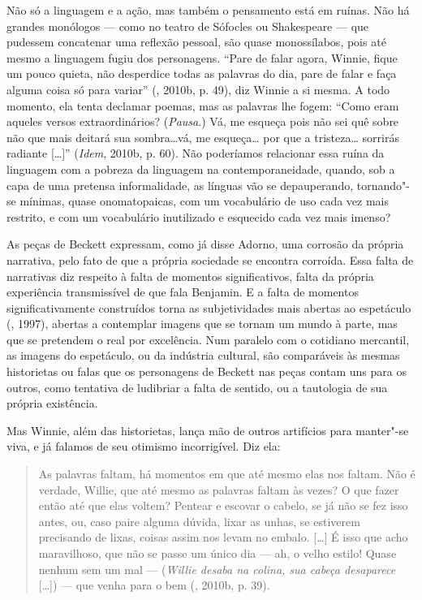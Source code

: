 Não só a linguagem e a ação, mas também o pensamento está em ruínas. Não
há grandes monólogos --- como no teatro de Sófocles ou Shakespeare --- que
pudessem concatenar uma reflexão pessoal, são quase monossílabos, pois
até mesmo a linguagem fugiu dos personagens. ``Pare de falar agora,
Winnie, fique um pouco quieta, não desperdice todas as palavras do dia,
pare de falar e faça alguma coisa só para variar'' (, 2010b, p.
49), diz Winnie a si mesma. A todo momento, ela tenta declamar poemas,
mas as palavras lhe fogem: ``Como eram aqueles versos extraordinários?
(\emph{Pausa}.) Vá, me esqueça pois não sei quê sobre não que mais
deitará sua sombra\ldots{}vá, me esqueça\ldots{} por que a tristeza\ldots{} sorrirás
radiante [\ldots{}]'' (\emph{Idem}, 2010b, p. 60). Não poderíamos
relacionar essa ruína da linguagem com a pobreza da linguagem na
contemporaneidade, quando, sob a capa de uma pretensa informalidade, as
línguas vão se depauperando, tornando"-se mínimas, quase onomatopaicas,
com um vocabulário de uso cada vez mais restrito, e com um vocabulário
inutilizado e esquecido cada vez mais imenso?

As peças de Beckett expressam, como já disse Adorno, uma corrosão da
própria narrativa, pelo fato de que a própria sociedade se encontra
corroída. Essa falta de narrativas diz respeito à falta de momentos
significativos, falta da própria experiência transmissível de que fala
Benjamin. E a falta de momentos significativamente construídos torna as
subjetividades mais abertas ao espetáculo (, 1997), abertas a
contemplar imagens que se tornam um mundo à parte, mas que se pretendem o
real por excelência. Num paralelo com o cotidiano mercantil, as imagens
do espetáculo, ou da indústria cultural, são comparáveis às mesmas
historietas ou falas que os personagens de Beckett nas peças contam uns
para os outros, como tentativa de ludibriar a falta de sentido, ou a
tautologia de sua própria existência.

Mas Winnie, além das historietas, lança mão de outros artifícios para
manter"-se viva, e já falamos de seu otimismo incorrigível. Diz ela:

\begin{quote}
As palavras faltam, há momentos em que até mesmo elas nos faltam. Não é
verdade, Willie, que até mesmo as palavras faltam às vezes? O que fazer
então até que elas voltem? Pentear e escovar o cabelo, se já não se fez
isso antes, ou, caso paire alguma dúvida, lixar as unhas, se estiverem
precisando de lixas, coisas assim nos levam no embalo. [\ldots{}] É
isso que acho maravilhoso, que não se passe um único dia --- ah, o velho
estilo! Quase nenhum sem um mal --- (\emph{Willie desaba na colina, sua
cabeça desaparece} [\ldots{}]) --- que venha para o bem (, 2010b, p. 39).
\end{quote}

